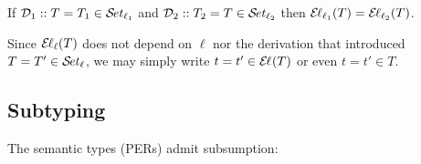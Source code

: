 \documentclass[acmsmall%
]{acmart}\settopmatter{printfolios=true}
\newcommand{\LONGVERSION}[1]{}
\begin{document}
\begin{lemma}
\label{lem:indep}
  If\/ $\DD_1 :: T = T_1 \in \SET[\ell_1]$
  and $\DD_2 :: T_2 = T \in \SET[\ell_2]$ then $\EL[\ell_1](T) = \EL[\ell_2](T)$.
\end{lemma}
\LONGVERSION{
\begin{proof}
  By induction on $\DD_1$ and cases on $\DD_2$.
\end{proof}
}
Since $\EL[\ell](T)$ does not depend on $\ell$ nor the derivation that introduced $T = T' \in \SET[\ell]$,  we may simply write $t = t' \in \EL(T)$ or even $t = t' \in T$.


\subsection{Subtyping}
\label{sec:subty}

The semantic types (PERs) admit subsumption:
\end{document}
